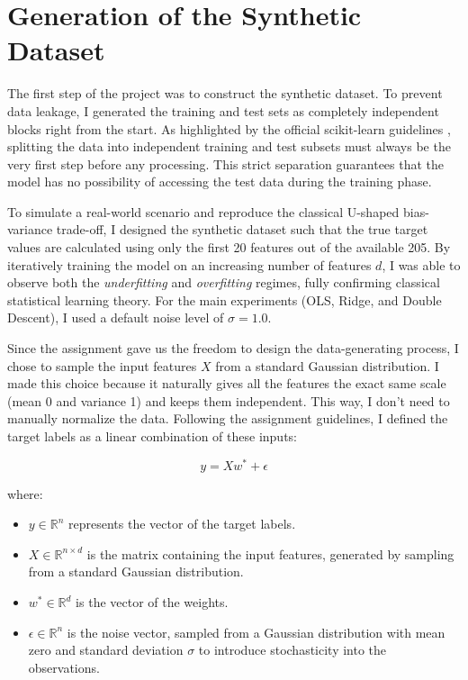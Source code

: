 \documentclass[11pt,a4paper]{article}
\begin{document}
\section{Generation of the Synthetic Dataset}

The first step of the project was to construct the synthetic dataset. To prevent data leakage, I generated the training and test sets as completely independent blocks right from the start. As highlighted by the official scikit-learn guidelines \cite{scikitlearnCommonPitfalls}, splitting the data into independent training and test subsets must always be the very first step before any processing. This strict separation guarantees that the model has no possibility of accessing the test data during the training phase.

To simulate a real-world scenario and reproduce the classical U-shaped bias-variance trade-off, I designed the synthetic dataset such that the true target values are calculated using only the first 20 features out of the available 205. By iteratively training the model on an increasing number of features $d$, I was able to observe both the \textit{underfitting} and \textit{overfitting} regimes, fully confirming classical statistical learning theory. For the main experiments (OLS, Ridge, and Double Descent), I used a default noise level of $\sigma = 1.0$.

Since the assignment gave us the freedom to design the data-generating process, I chose to sample the input features $X$ from a standard Gaussian distribution. I made this choice because it naturally gives all the features the exact same scale (mean 0 and variance 1) and keeps them independent. This way, I don't need to manually normalize the data. Following the assignment guidelines, I defined the target labels as a linear combination of these inputs:

\[
y = X w^* + \epsilon
\]

where:

\begin{itemize}
    \item $y \in \mathbb{R}^n$ represents the vector of the target labels.
    \item $X \in \mathbb{R}^{n \times d}$ is the matrix containing the input features, generated by sampling from a standard Gaussian distribution.
    \item $w^* \in \mathbb{R}^d$ is the vector of the weights.
    \item $\epsilon \in \mathbb{R}^n$ is the noise vector, sampled from a Gaussian distribution with mean zero and standard deviation $\sigma$ to introduce stochasticity into the observations.
\end{itemize}
\end{document}
